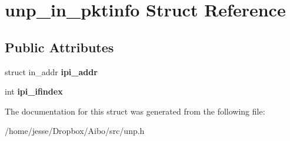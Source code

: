 \hypertarget{structunp__in__pktinfo}{
\section{unp\_\-in\_\-pktinfo Struct Reference}
\label{structunp__in__pktinfo}
}
\subsection*{Public Attributes}
\begin{DoxyCompactItemize}
\item 
\hypertarget{structunp__in__pktinfo_a29a04e27656776a83216a7e4bee5e3bd}{
struct in\_\-addr {\bfseries ipi\_\-addr}}
\label{structunp__in__pktinfo_a29a04e27656776a83216a7e4bee5e3bd}

\item 
\hypertarget{structunp__in__pktinfo_a70d60bd26a465b88004ddf70ed0c109c}{
int {\bfseries ipi\_\-ifindex}}
\label{structunp__in__pktinfo_a70d60bd26a465b88004ddf70ed0c109c}

\end{DoxyCompactItemize}


The documentation for this struct was generated from the following file:\begin{DoxyCompactItemize}
\item 
/home/jesse/Dropbox/Aibo/src/unp.h\end{DoxyCompactItemize}
